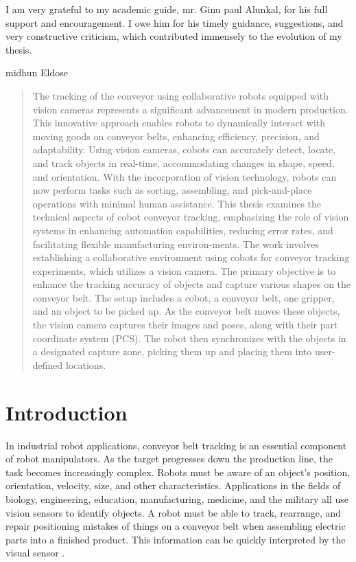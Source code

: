 \documentclass[12pt]{article}
\begin{document}
    \vspace{1cm}

    I am very grateful to my academic guide, mr. Ginu paul Alunkal, for his full support and encouragement. I owe him for his timely guidance, suggestions, and very constructive criticism, which contributed immensely to the evolution of my thesis.
    
    \vspace{1.5 cm}
    
    
    midhun Eldose


\newpage
\begin{abstract}
The tracking of the conveyor using collaborative robots equipped with vision cameras represents a significant advancement in modern production. This innovative approach enables robots to dynamically interact with moving goods on conveyor belts, enhancing efficiency, precision, and adaptability. Using vision cameras, cobots can accurately detect, locate, and track objects in real-time, accommodating changes in shape, speed, and orientation. With the incorporation of vision technology, robots can now perform tasks such as sorting, assembling, and pick-and-place operations with minimal human assistance. This thesis examines the technical aspects of cobot conveyor tracking, emphasizing the role of vision systems in enhancing automation capabilities, reducing error rates, and facilitating flexible manufacturing environ-ments. The work involves establishing a collaborative environment using cobots for conveyor tracking experiments, which utilizes a vision camera. The primary objective is to enhance the tracking accuracy of objects and capture various shapes on the conveyor belt. The setup includes a cobot, a conveyor belt, one gripper, and an object to be picked up. As the conveyor belt moves these objects, the vision camera captures their images and poses, along with their part coordinate system (PCS). The robot then synchronizes with the objects in a designated capture zone, picking them up and placing them into user-defined locations. 
\end{abstract}
\newpage
\section{Introduction}
\label{introduction}

In industrial robot applications, conveyor belt tracking is an essential component of robot manipulators.  As the target progresses down the production line, the task becomes increasingly complex. Robots must be aware of an object's position, orientation, velocity, size, and other characteristics.  Applications in the fields of biology, engineering, education, manufacturing, medicine, and the military all use vision sensors to identify objects.  A robot must be able to track, rearrange, and repair positioning mistakes of things on a conveyor belt when assembling electric parts into a finished product.  This information can be quickly interpreted by the visual sensor \cite{ref12}.\\
\end{document}
